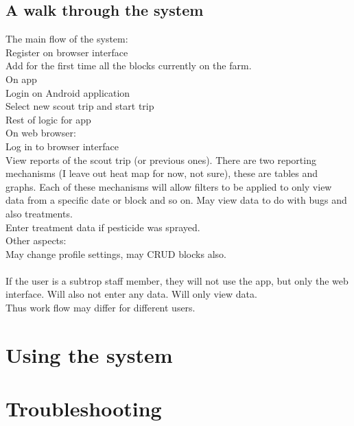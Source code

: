 \documentclass[11pt,a4paper,titlepage]{article}
\begin{document}
\subsection{A walk through the system}


The main flow of the system:\\
Register on browser interface\\
Add for the first time all the blocks currently on the farm.\\

On app\\
Login on Android application\\
Select new scout trip and start trip\\
Rest of logic for app\\

On web browser:\\
Log in to browser interface\\
View reports of the scout trip (or previous ones). There are two reporting mechanisms (I leave out heat map for now, not sure), these are tables and graphs. Each of these mechanisms will allow filters to be applied to only view data from a specific date or block and so on. May view data to do with bugs and also treatments.\\
Enter treatment data if pesticide was sprayed.\\

Other aspects:\\
May change profile settings, may CRUD blocks also.\\\\

If the user is a subtrop staff member, they will not use the app, but only the web interface. Will also not enter any data. Will only view data.\\

Thus work flow may differ for different users.



\section{Using the system}

\section{Troubleshooting}
\end{document}
